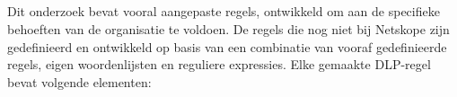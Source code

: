 
\subsection{}
\label{subsec:poc-aangepaste-regelsets}


Dit onderzoek bevat vooral aangepaste regels, ontwikkeld om aan de specifieke behoeften van de organisatie te voldoen. 
De regels die nog niet bij Netskope zijn gedefinieerd en ontwikkeld op basis van een combinatie van vooraf gedefinieerde regels, eigen woordenlijsten en reguliere expressies. 
Elke gemaakte DLP-regel bevat volgende elementen:


